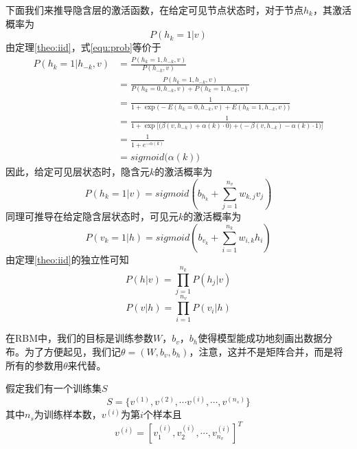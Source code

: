 下面我们来推导隐含层的激活函数，在给定可见节点状态时，对于节点$h_k$，其激活概率为
\begin{equation}\label{equ:prob}
P(h_k = 1| v)
\end{equation}
由定理\ref{theo:iid}，式\eqref{equ:prob}等价于
\begin{equation}
\begin{split}
P(h_k = 1|h_{-k}, v) &= \frac{P(h_k = 1, h_{-k}, v)}{P(h_{-k}, v)}\\
&= \frac{P(h_k = 1, h_{-k}, v)}{P(h_k=0,h_{-k} , v) +P(h_k=1, h_{-k} , v)  }\\
&=\frac{1}{1 + \exp\Big(-E(h_k = 0, h_{-k}, v) +E(h_k = 1, h_{-k}, v)  \Big)}\\
&= \frac{1}{1 + \exp\Big[  \Big(\beta(v, h_{-k})+ \alpha(k)\cdot 0\Big) + \Big(-\beta(v, h_{-k})- \alpha(k)\cdot 1\Big)  \Big]}\\
&= \frac{1}{1 + e^{-\alpha(k)}}\\
&=sigmoid\Big(\alpha(k)\Big)
\end{split}
\end{equation}
因此，给定可见层状态时，隐含元$k$的激活概率为
\begin{equation}\label{p(h_k|v)}
P(h_k =1| v) = sigmoid(b_{h_k} + \sum\limits_{j=1}^{n_v}w_{k, j}v_j)
\end{equation}
同理可推导在给定隐含层状态时，可见元$k$的激活概率为
\begin{equation}\label{p(v_k|h)}
P(v_k = 1|h) = sigmoid(b_{v_k} + \sum\limits_{i=1}^{n_k}w_{i, k}h_i)
\end{equation}
由定理\ref{theo:iid}的独立性可知
\begin{equation}\label{p(h|v)}
P(h|v) = \prod\limits_{j=1}^{n_k}P(h_j|v)
\end{equation}
\begin{equation}\label{p(v|h)}
P(v|h) = \prod\limits_{i=1}^{n_v}P(v_i|h)
\end{equation}

在RBM中，我们的目标是训练参数$W$，$b_v$，$b_h$使得模型能成功地刻画出数据分布。为了方便起见，我们记$\theta = (W, b_v, b_h)$，注意，这并不是矩阵合并，而是将所有的参数用$\theta$来代替。

假定我们有一个训练集$S$
\begin{equation}
S = \{v^{(1)}, v^{(2)}, \cdots v^{(i)}, \cdots, v^{(n_s)}\}
\end{equation}
其中$n_s$为训练样本数，$v^{(i)}$为第$i$个样本且
\begin{equation}
v^{(i)} = [v_1^{(i)}, v_2^{(i)}, \cdots, v_{n_v}^{(i)} ]^T
\end{equation}

